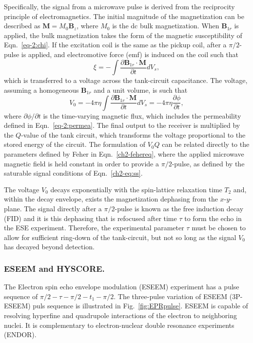 Specifically, the signal from a microwave pulse is derived from the reciprocity principle of electromagnetics. \cite{HOULT2011329} The initial magnitude of the magnetization can be described as $\mathbf{M} = M_0 \mathbf{B}_z$, where $M_0$ is the dc bulk magnetization. When $\mathbf{B}_{1r}$ is applied, the bulk magnetization takes the form of the magnetic susceptibility of Eqn.~\ref{eq-2:chi}. If the excitation coil is the same as the pickup coil, after a $\pi/2$-pulse is applied, and electromotive force (emf) is induced on the coil such that 
\begin{equation}
    \xi = - \int \frac{\partial \mathbf{B}_{1r} \cdot \mathbf{M}}{\partial t} dV_s,
\end{equation}
which is transferred to a voltage across the tank-circuit capacitance. The voltage, assuming a homogeneous $\mathbf{B}_{1r}$ and a unit volume, is such that
\begin{equation}
    V_0 = - 4\pi \eta \int \frac{\partial \mathbf{B}_{1r} \cdot \mathbf{M}}{\partial t} dV_s = - 4 \pi \eta \frac{\partial \phi}{\partial t},
\end{equation}
where $\partial \phi/\partial t$ is the time-varying magnetic flux, which includes the permeability defined in Eqn.~\ref{eq-2:permea}. \cite{schumacher1970introduction,slichter1978principles,HOULT2011329} The final output to the receiver is multiplied by the $Q$-value of the tank circuit, which transforms the voltage proportional to the stored energy of the circuit. \cite{ramo1984fields} The formulation of $V_0 Q$ can be related directly to the parameters defined by Feher in Eqn.~\ref{ch2-fehereq}, where the applied microwave magnetic field is held constant in order to provide a $\pi/2$-pulse, as defined by the saturable signal conditions of Eqn.~\ref{ch2-eq:ss}.

The voltage $V_0$ decays exponentially with the spin-lattice relaxation time $T_2$ and, within the decay envelope, exists the magnetization dephasing from the $x$-$y$-plane. The signal directly after a $\pi/2$-pulse is known as the free induction decay (FID) and it is this dephasing that is refocused after time $\tau$ to form the echo in the ESE experiment. Therefore, the experimental parameter $\tau$ must be chosen to allow for sufficient ring-down of the tank-circuit, but not so long as the signal $V_0$ has decayed beyond detection.

\subsubsection*{ESEEM and HYSCORE.}
The Electron spin echo envelope modulation (ESEEM) experiment has a  pulse sequence of ${\pi/2\!-\!\tau\!-\!\pi/2\!-\!t_1\!-\!\pi/2}$. The three-pulse variation of ESEEM (3P-ESEEM) puls sequence is illustrated in Fig.~\ref{fig:EPRpulse}. ESEEM is capable of resolving hyperfine and quadrupole interactions of the electron to neighboring nuclei. It is complementary to electron-nuclear double resonance experiments (ENDOR). \cite{schweiger2001principles,Doorslaer2007,Harmer2009,CUTSAIL20151370}

